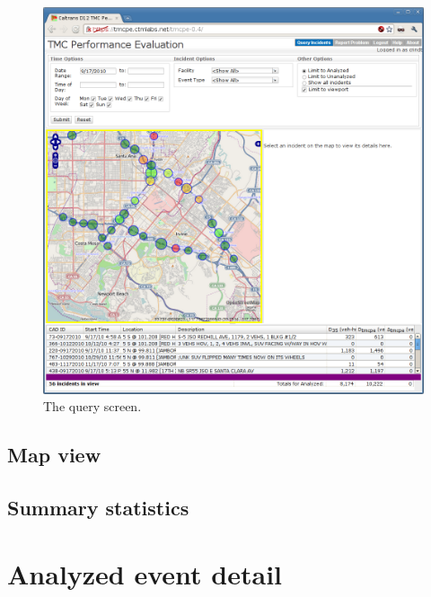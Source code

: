 \documentclass[12pt]{report}
\begin{document}
\begin{figure}[t]
  \begin{center}
    \includegraphics[width=\textwidth]{images/tmcpe-query-screen.png}
    \caption{The query screen.}
    \label{fig:tmcpe-1}
  \end{center}
\end{figure}


\subsection{Map view}
\label{sec:ui-summary-stats}


\subsection{Summary statistics}
\label{sec:ui-summary-stats}

\section{Analyzed event detail}
\label{sec:ui-analyzed-event-detail}
\end{document}
